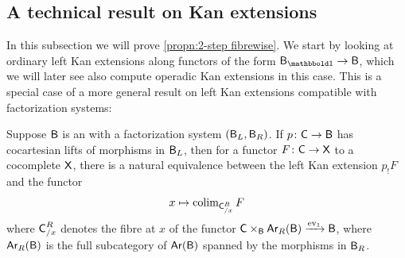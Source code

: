 \documentclass[a4paper,11pt]{article}
\begin{document}
\subsection{A technical result on Kan extensions}
\label{sec:kan ext result}
In this subsection we will prove \cref{propn:2-step fibrewise}. We
start by looking at ordinary left Kan extensions along functors of the form $\oB_{\bbone} \to
\oB$, which we will later see also compute operadic Kan extensions in
this case. This is a special case of a more general result on left Kan
extensions compatible with factorization systems:

\begin{propn}\label{propn:lkefact}
  Suppose $\textup{\textsf{B}}$ is an \icat{} with a factorization system
  $(\textup{\textsf{B}}_{L},\textup{\textsf{B}}_{R})$. If $p \colon \oC \to \oB$ has cocartesian lifts
  of morphisms in $\textup{\textsf{B}}_{L}$, then for a functor $F \colon \oC \to \oX$
  to a cocomplete \icat{} $\textup{\textsf{X}}$, there is a natural equivalence
  between the left Kan extension $p_{!}F$ and the functor 
  \[ x \mapsto \operatorname{colim}_{\textup{\textsf{C}}_{/x}^{R}} F \] where $\textup{\textsf{C}}_{/x}^{R}$ denotes
  the fibre at $x$ of the functor
  $\oC \times_{\oB} \Ar_{R}(\oB) \xto{\ev_{1}} \oB$, where $\textup{\textsf{Ar}}_{R}(\textup{\textsf{B}})$
  is the full subcategory of $\textup{\textsf{Ar}}(\textup{\textsf{B}})$ spanned by the morphisms in
  $\textup{\textsf{B}}_{R}$.
\end{propn}
\end{document}
